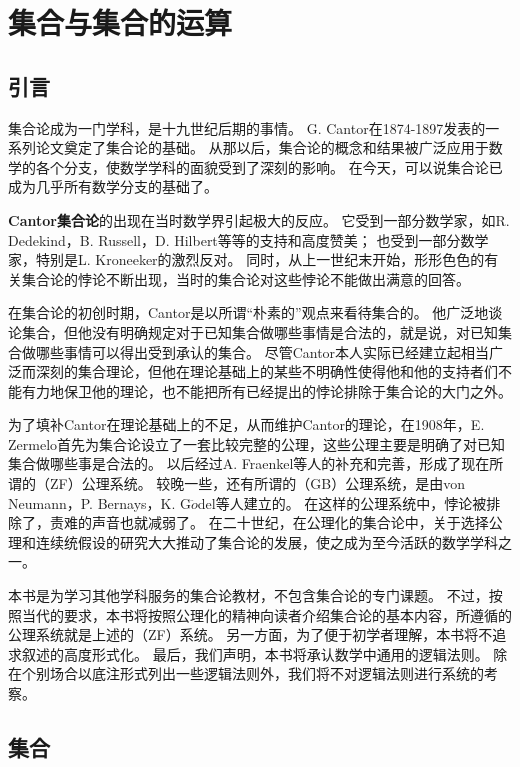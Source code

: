 \chapter{集合与集合的运算}

\section{引言}

集合论成为一门学科，是十九世纪后期的事情。
G. Cantor在1874-1897发表的一系列论文奠定了集合论的基础。
从那以后，集合论的概念和结果被广泛应用于数学的各个分支，使数学学科的面貌受到了深刻的影响。
在今天，可以说集合论已成为几乎所有数学分支的基础了。

\textbf{Cantor集合论}的出现在当时数学界引起极大的反应。
它受到一部分数学家，如R. Dedekind，B. Russell，D. Hilbert等等的支持和高度赞美；
也受到一部分数学家，特别是L. Kroneeker的激烈反对。
同时，从上一世纪末开始，形形色色的有关集合论的悖论不断出现，当时的集合论对这些悖论不能做出满意的回答。

在集合论的初创时期，Cantor是以所谓“朴素的”观点来看待集合的。
他广泛地谈论集合，但他没有明确规定对于已知集合做哪些事情是合法的，就是说，对已知集合做哪些事情可以得出受到承认的集合。
尽管Cantor本人实际已经建立起相当广泛而深刻的集合理论，但他在理论基础上的某些不明确性使得他和他的支持者们不能有力地保卫他的理论，也不能把所有已经提出的悖论排除于集合论的大门之外。

为了填补Cantor在理论基础上的不足，从而维护Cantor的理论，在1908年，E. Zermelo首先为集合论设立了一套比较完整的公理，这些公理主要是明确了对已知集合做哪些事是合法的。
以后经过A. Fraenkel等人的补充和完善，形成了现在所谓的（ZF）公理系统。
较晚一些，还有所谓的（GB）公理系统，是由von Neumann，P. Bernays，K. G$\ddot{o}$del等人建立的。
在这样的公理系统中，悖论被排除了，责难的声音也就减弱了。
在二十世纪，在公理化的集合论中，关于选择公理和连续统假设的研究大大推动了集合论的发展，使之成为至今活跃的数学学科之一。

本书是为学习其他学科服务的集合论教材，不包含集合论的专门课题。
不过，按照当代的要求，本书将按照公理化的精神向读者介绍集合论的基本内容，所遵循的公理系统就是上述的（ZF）系统。
另一方面，为了便于初学者理解，本书将不追求叙述的高度形式化。
最后，我们声明，本书将承认数学中通用的逻辑法则。
除在个别场合以底注形式列出一些逻辑法则外，我们将不对逻辑法则进行系统的考察。

\section{集合}

